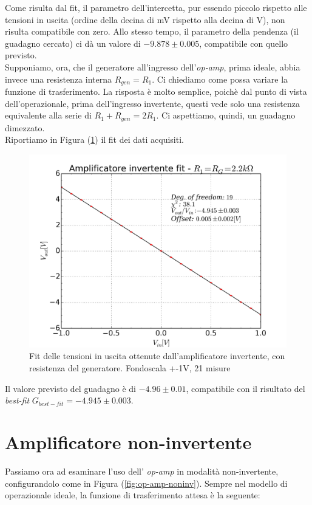 \documentclass[journal, a4paper]{IEEEtran}
\begin{document}
Come risulta dal fit, il parametro dell'intercetta, pur essendo piccolo rispetto alle tensioni in uscita (ordine della decina di \si{mV} rispetto alla decina di \si{V}), non risulta compatibile con zero. Allo stesso tempo, il parametro della pendenza (il guadagno cercato) ci dà un valore di $-9.878 \pm 0.005$, compatibile con quello previsto.\\

Supponiamo, ora, che il generatore all'ingresso dell'\textit{op-amp}, prima ideale, abbia invece una resistenza interna $R_{gen} = R_1 $. Ci chiediamo come possa variare la funzione di trasferimento. La risposta è molto semplice, poichè dal punto di vista dell'operazionale, prima dell'ingresso invertente, questi vede solo una resistenza equivalente alla serie di $R_1 + R_{gen} = 2R_1$. Ci aspettiamo, quindi, un guadagno dimezzato.\\

Riportiamo in Figura (\ref{fig:fit_V_ripetuti_21mis_rgen}) il fit dei dati acquisiti. 

\begin{figure}
\centering
\includegraphics[width=0.9\linewidth]{./fit_V_ripetuti_21mis_rgen}
\caption{Fit delle tensioni in uscita ottenute dall'amplificatore invertente, con resistenza del generatore. Fondoscala +-1V, 21 misure}
\label{fig:fit_V_ripetuti_21mis_rgen}
\end{figure}

Il valore previsto del guadagno è di $ -4.96 \pm 0.01$, compatibile con il risultato del \textit{best-fit} $G_{best-fit} = -4.945 \pm 0.003$.

\section{Amplificatore non-invertente}
Passiamo ora ad esaminare l'uso dell' \textit{op-amp} in modalità non-invertente, configurandolo come in Figura (\ref{fig:op-amp-noninv}). Sempre nel modello di operazionale ideale, la funzione di trasferimento attesa è la seguente:\\
\end{document}
